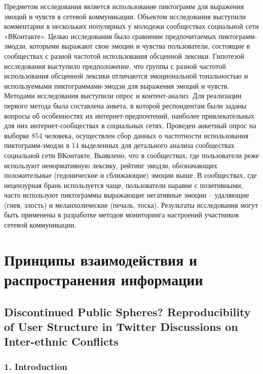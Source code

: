 Предметом исследования является использование пиктограмм для выражения эмоций и чувств в сетевой коммуникации. Объектом исследования выступили комментарии в нескольких популярных у молодежи сообществах социальной сети «ВКонтакте». Целью исследования было сравнение предпочитаемых пиктограмм-эмодзи, которыми выражают свои эмоции и чувства пользователи, состоящие в сообществах с разной частотой использования обсценной лексики. Гипотезой исследования выступило предположение, что группы с разной частотой использования обсценной лексики отличаются эмоциональной тональностью и используемыми пиктограммами-эмодзи для выражения эмоций и чувств. Методами исследования выступили опрос и контент-анализ. Для реализации первого метода была составлена анкета, в которой респондентам были заданы вопросы об особенностях их интернет-предпочтений, наиболее привлекательных для них интернет-сообществах в социальных сетях. Проведен анкетный опрос на выборке 854 человека, осуществлен сбор данных о частотности использования пиктограмм-эмодзи в 14 выделенных для детального анализа сообществах социальной сети ВКонтакте. Выявлено, что в сообществах, где пользователи реже используют ненормативную лексику, рейтинг эмодзи, обозначающих положительные (гедонические и сближающие) эмоции выше. В сообществах, где нецензурная брань используется чаще, пользователи наравне с позитивными, часто используют пиктограммы выражающие негативные эмоции -- удаляющие (гнев, злость) и меланхолические (печаль, тоска). Результаты исследования могут быть применены в разработке методов мониторинга настроений участников сетевой коммуникации.

\section{Принципы взаимодействия и распространения информации}\label{sec:ch3/sec1}

\subsection{Discontinued Public Spheres? Reproducibility of User Structure in Twitter Discussions on Inter-ethnic Conflicts}\label{subsec:ch3/sec1/sub1}

\subsubsection{1. Introduction}\label{subsubsec:ch3/sec1/sub1/subsub1}

